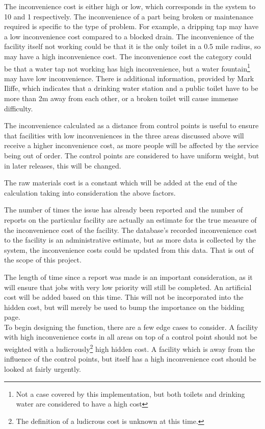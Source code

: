 The inconvenience cost is either high or low, which corresponds in the system to 10 and 1 respectively. The inconvenience of a part being broken or maintenance required is specific to the type of problem. For example, a dripping tap may have a low inconvenience cost compared to a blocked drain. The inconvenience of the facility itself not working could be that it is the only toilet in a 0.5 mile radius, so may have a high inconvenience cost. The inconvenience cost the category could be that a water tap not working has high inconvenience, but a water fountain\footnote{Not a case covered by this implementation, but both toilets and drinking water are considered to have a high cost} may have low inconvenience. There is additional information, provided by Mark Iliffe, which indicates that a drinking water station and a public toilet have to be more than 2m away from each other, or a broken toilet will cause immense difficulty.

The inconvenience calculated as a distance from control points is useful to ensure that facilities with low inconveniences in the three areas discussed above will receive a higher inconvenience cost, as more people will be affected by the service being out of order. The control points are considered to have uniform weight, but in later releases, this will be changed.

The raw materials cost is a constant which will be added at the end of the calculation taking into consideration the above factors.

The number of times the issue has already been reported and the number of reports on the particular facility are actually an estimate for the true measure of the inconvenience cost of the facility. The database's recorded inconvenience cost to the facility is an administrative estimate, but as more data is collected by the system, the inconvenience costs could be updated from this data. That is out of the scope of this project.

The length of time since a report was made is an important consideration, as it will ensure that jobs with very low priority will still be completed. An artificial cost will be added based on this time. This will not be incorporated into the hidden cost, but will merely be used to bump the importance on the bidding page. \\

To begin designing the function, there are a few edge cases to consider. A facility with high inconvenience costs in all areas on top of a control point should not be weighted with a ludicrously\footnote{The definition of a ludicrous cost is unknown at this time.} high hidden cost.
A facility which is away from the influence of the control points, but itself has a high inconvenience cost should be looked at fairly urgently.

